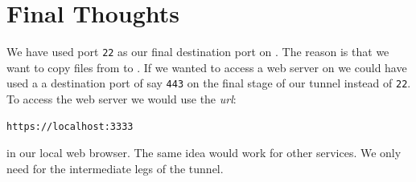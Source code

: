 \section{Final Thoughts}
We have used port \texttt{22} as our final destination port on .
The reason is that we want to copy files from  to \base.  If
we wanted to access a web server on  we could have used a
a destination port of say \texttt{443} on the final stage of our
tunnel instead of \texttt{22}.  To access the web server we would use
the \textit{url}:
\begin{verbatim}
https://localhost:3333
\end{verbatim}
in our local web browser. The same idea would work for other services.
We only need \ssh for the intermediate legs of the tunnel. 


